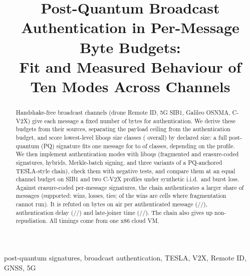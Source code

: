 \documentclass[conference]{IEEEtran}
\begin{document}
\title{Post-Quantum Broadcast Authentication in Per-Message Byte Budgets:\\
Fit and Measured Behaviour of Ten Modes Across Channels}

\author{
}

\maketitle

\noindent{}

\begin{abstract}
Handshake-free broadcast channels (drone Remote ID, 5G SIB1, Galileo OSNMA,
C-V2X) give each message a fixed number of bytes for authentication. We
derive these budgets from their sources, separating the payload ceiling
from the authentication budget, and score \NumClassesLow{} lowest-level
liboqs size classes (\NumClasses{} overall) by declared size: a full
post-quantum (PQ) signature fits one message for \FullFitMin{} to
\FullFitMax{} of \NumClassesLow{} classes, depending on the profile. We then
implement \NumModes{} authentication modes with liboqs (fragmented and
erasure-coded signatures, hybrids, Merkle-batch signing, and three variants
of a PQ-anchored TESLA-style chain), check them with \NegRuns{} negative
tests, and compare them at an equal channel budget on SIB1 and two C-V2X
profiles under synthetic i.i.d.\ and burst loss. Against erasure-coded
per-message signatures, the chain authenticates a larger share of messages
(supported: \HaW{} wins, \HaL{} losses, \HaT{} ties; \HaInfeas{} of the wins
are cells where fragmentation cannot run). It is refuted on bytes on air per
authenticated message (\HbW/\HbL/\HbT), authentication delay
(\HcW/\HcL/\HcT) and late-joiner time (\HdW/\HdL/\HdT). The chain also gives
up non-repudiation. All timings come from one x86 cloud VM.
\end{abstract}

\begin{IEEEkeywords}
post-quantum signatures, broadcast authentication, TESLA, V2X, Remote ID,
GNSS, 5G
\end{IEEEkeywords}
\end{document}
